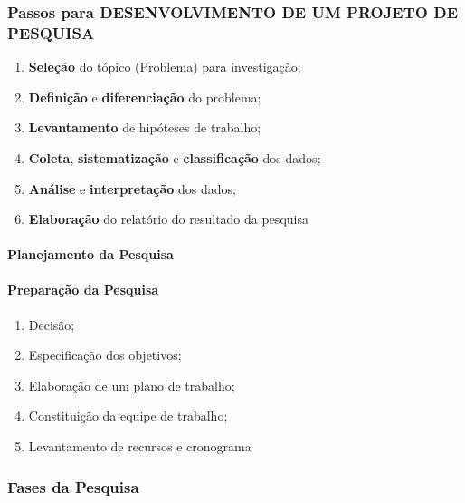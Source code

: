 \documentclass[
]{book}
\providecommand{\tightlist}{%
  \setlength{\itemsep}{0pt}\setlength{\parskip}{0pt}}
\begin{document}
\hypertarget{passos-para-desenvolvimento-de-um-projeto-de-pesquisa}{%
\subsubsection{Passos para DESENVOLVIMENTO DE UM PROJETO DE
PESQUISA}\label{passos-para-desenvolvimento-de-um-projeto-de-pesquisa}}

\begin{enumerate}
\def\labelenumi{\arabic{enumi}.}
\tightlist
\item
  \textbf{Seleção} do tópico (Problema) para investigação;
\item
  \textbf{Definição} e \textbf{diferenciação} do problema;
\item
  \textbf{Levantamento} de hipóteses de trabalho;
\item
  \textbf{Coleta}, \textbf{sistematização} e \textbf{classificação} dos
  dados;
\item
  \textbf{Análise} e \textbf{interpretação} dos dados;
\item
  \textbf{Elaboração} do relatório do resultado da pesquisa
\end{enumerate}

\hypertarget{planejamento-da-pesquisa}{%
\paragraph{Planejamento da Pesquisa}\label{planejamento-da-pesquisa}}

\hypertarget{preparauxe7uxe3o-da-pesquisa}{%
\paragraph{Preparação da Pesquisa}\label{preparauxe7uxe3o-da-pesquisa}}

\begin{enumerate}
\def\labelenumi{\arabic{enumi}.}
\tightlist
\item
  Decisão;
\item
  Especificação dos objetivos;
\item
  Elaboração de um plano de trabalho;
\item
  Constituição da equipe de trabalho;
\item
  Levantamento de recursos e cronograma
\end{enumerate}

\hypertarget{fases-da-pesquisa}{%
\subsubsection{Fases da Pesquisa}\label{fases-da-pesquisa}}
\end{document}
